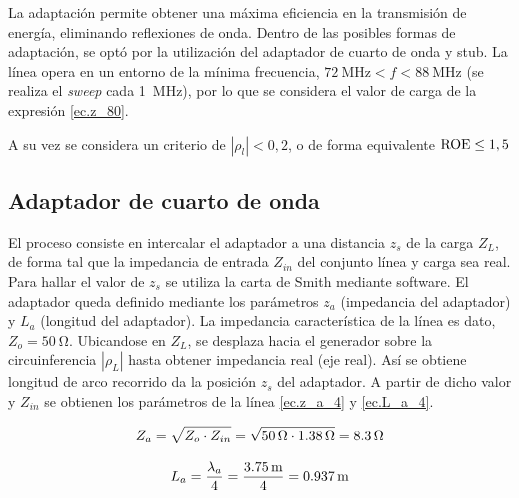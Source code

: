 La adaptación permite obtener una máxima eficiencia en la transmisión de energía, eliminando reflexiones de onda. Dentro de las posibles formas de adaptación, se optó por la utilización del adaptador de cuarto de onda y stub. La línea opera en un entorno de la mínima frecuencia, $\SI{72}{\mega\hertz} < f < \SI{88}{\mega\hertz}$ (se realiza el \emph{sweep} cada \SI{1}{\mega\hertz}), por lo que se considera el valor de carga de la expresión \eqref{ec.z_80}.

A su vez se considera un criterio de $|\rho_l|<0,2$, o de forma equivalente $\rm{ROE} \leq 1,5$

\subsection{Adaptador de cuarto de onda}
El proceso consiste en intercalar el adaptador a una distancia $z_s$ de la carga $Z_L$, de forma tal que la impedancia de entrada $Z_{in}$ del conjunto línea y carga sea real. Para hallar el valor de $z_s$ se utiliza la carta de Smith mediante software. El adaptador queda definido mediante los parámetros $z_a$ (impedancia del adaptador) y $L_a$ (longitud del adaptador). La impedancia característica de la línea es dato, $Z_o = \SI{50}{\ohm}$. Ubicandose en $Z_L$, se desplaza hacia el generador sobre la circuinferencia $|\rho_L|$ hasta obtener impedancia real (eje real). Así se obtiene longitud de arco recorrido da la posición $z_s$ del adaptador. A partir de dicho valor y $Z_{in}$ se obtienen los parámetros de la línea \eqref{ec.z_a_4} y \eqref{ec.L_a_4}.

\begin{equation}
	\centering
	Z_a = \sqrt{Z_o \cdot Z_{in}} = \sqrt{ \SI{50}{\ohm} \cdot \SI{1.38}{\ohm} } = \SI{8.3}{\ohm}
	\label{ec.z_a_4}
\end{equation}	

\begin{equation}
	\centering
	L_a = \frac{\lambda_a}{4} = \frac{ \SI{3.75}{\meter} }{4} = \SI{0.937}{\meter}
	\label{ec.L_a_4}
\end{equation}


